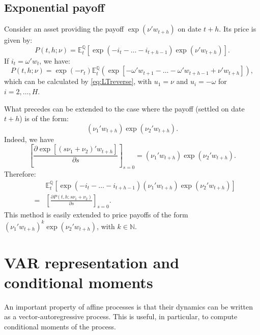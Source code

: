 \documentclass[
  12pt,
]{book}
\theoremstyle{definition}
\theoremstyle{definition}
\theoremstyle{definition}
\theoremstyle{definition}
\theoremstyle{remark}
\begin{document}
\hypertarget{ExponentialPayoff}{%
\subsection{Exponential payoff}\label{ExponentialPayoff}}

Consider an asset providing the payoff \(\exp(\nu' w_{t+h})\) on date \(t+h\). Its price is given by:
\[
P(t,h;\nu) = \mathbb{E}^{\mathbb{Q}}_t[\exp(-i_{t}-\dots-i_{t+h-1}) \exp(\nu' w_{t+h})].
\]
If \(i_t = \omega'w_t\), we have:
\[
P(t,h;\nu) = \exp(-r_{t})\mathbb{E}^{\mathbb{Q}}_t \left(\exp[-\omega' w_{t+1}-\dots-\omega' w_{t+h-1}+ \nu' w_{t+h}]\right),
\]
which can be calculated by \eqref{eq:LTreverse}, with \(u_1 = \nu\) and \(u_i = -\omega\) for \(i = 2,\dots,H\).

What precedes can be extended to the case where the payoff (settled on date \(t+h\)) is of the form:
\[
(\nu_1'w_{t+h}) \exp(\nu_2' w_{t+h}).
\]
Indeed, we have
\[
\left[\frac{\partial \exp[(s \nu_1+ \nu_2)'w_{t+h}]}{\partial s}\right]_{s=0} = (\nu_1'w_{t+h}) \exp(\nu_2' w_{t+h}).
\]
Therefore:
\begin{eqnarray}
&&\mathbb{E}_t^{\mathbb{Q}}[\exp(-i_t - \dots - i_{t+h-1})(\nu_1'w_{t+h}) \exp(\nu_2' w_{t+h})] \nonumber\\
&=& \left[
\frac{\partial P(t,h;s \nu_1 + \nu_2)}{\partial s}
\right]_{s=0}.\label{eq:Affineexppayoff}
\end{eqnarray}
This method is easily extended to price payoffs of the form \((\nu_1'w_{t+h})^k \exp(\nu_2' w_{t+h})\), with \(k \in \mathbb{N}\).

\hypertarget{var-representation-and-conditional-moments}{%
\section{VAR representation and conditional moments}\label{var-representation-and-conditional-moments}}

An important property of affine processes is that their dynamics can be written as a vector-autoregressive process. This is useful, in particular, to compute conditional moments of the process.
\end{document}
